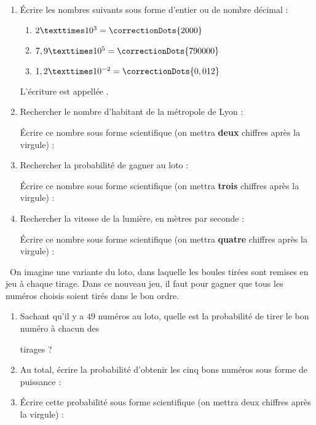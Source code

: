 \documentclass[
	classe=$2^{de}$,
	exercices=Activité\space Chapitre\space 2
]{exercice}
\begin{document}
\vspace{1em}
\begin{exercice}\

	\begin{enumerate}
		\item Écrire les nombres suivants sous forme d'entier ou de nombre décimal :
		      \begin{multicols}{3}
			      \begin{enumerate}
				      \item $2 × 10^{3} = \correctionDots{2000}$
				      \item $7,9 × 10^{5} = \correctionDots{790000}$
				      \item $1,2 × 10^{-2} = \correctionDots{0,012}$
			      \end{enumerate}
		      \end{multicols}
		      L'écriture  est appellée . \vspace{1em}
		\item Rechercher le nombre d'habitant de la métropole de Lyon : 

		      Écrire ce nombre sous forme scientifique (on mettra \textbf{deux} chiffres après la virgule) : 
		\item Rechercher la probabilité de gagner au loto : 

		      Écrire ce nombre sous forme scientifique (on mettra \textbf{trois} chiffres après la virgule) : 
		\item Rechercher la vitesse de la lumière, en mètres par seconde : 

		      Écrire ce nombre sous forme scientifique (on mettra \textbf{quatre} chiffres après la virgule) : 
	\end{enumerate}
\end{exercice}

\vspace{1em}
\begin{exercice}\
	On imagine une variante du loto, dans laquelle les boules tirées sont remises en jeu à chaque tirage. Dans ce nouveau jeu, il faut pour gagner que tous les numéros choisis soient tirés dans le bon ordre.

	\begin{enumerate}
		\item Sachant qu'il y a $49$ numéros au loto, quelle est la probabilité de tirer le bon numéro à chacun des \vspace{0em}

		      tirages ?
		\item Au total, écrire la probabilité d'obtenir les cinq bons numéros sous forme de puissance : 
		\item Écrire cette probabilité sous forme scientifique (on mettra deux chiffres après la virgule) :

	\end{enumerate}
\end{exercice}
\end{document}
